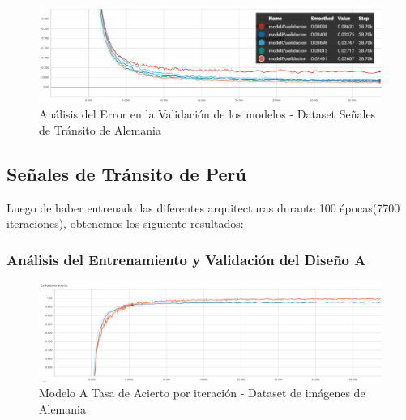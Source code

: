 			\begin{figure}[H]
				\includegraphics[width=1\textwidth, height=\textheight,keepaspectratio]{images/desarrollo/trainResults/germanSummary_validError} 
				\begin{center}
				\caption{\small{Análisis del Error en la Validación de los modelos - Dataset Señales de Tránsito de Alemania}}
				
				{\small{\fontsize{10}{16.8}\selectfont {Fuente: Elaboración propia}}}
				\end{center}
				\vspace{-1.5em}
			\end{figure}
	\newpage
	\subsection{Señales de Tránsito de Perú}
		Luego de haber entrenado las diferentes arquitecturas durante 100 épocas(7700 iteraciones), obtenemos los siguiente resultados:

		\subsubsection{Análisis del Entrenamiento y Validación del Diseño A}  
			\begin{figure}[H]
				\begin{center}
				\includegraphics[width=1\textwidth]{images/desarrollo/trainResults/peru/model0Acierto} 
				\end{center}
				\begin{center}
				\caption{\small{Modelo A Tasa de Acierto por iteración - Dataset de imágenes de Alemania  }}
				
				{\small{\fontsize{10}{16.8}\selectfont {Fuente: Elaboración propia}}}
				\end{center}
				\vspace{-1.5em}
			\end{figure}

